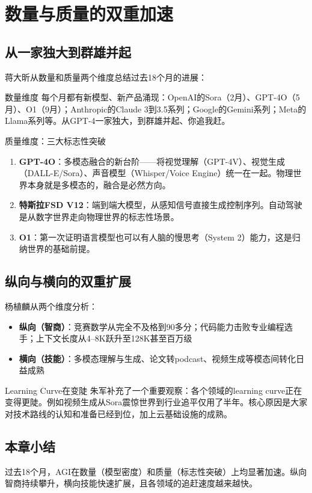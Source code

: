\section{数量与质量的双重加速}

\subsection{从一家独大到群雄并起}

蒋大昕从数量和质量两个维度总结过去18个月的进展：

\begin{knowledgebox}{数量维度}
每个月都有新模型、新产品涌现：OpenAI的Sora（2月）、GPT-4O（5月）、O1（9月）；Anthropic的Claude 3到3.5系列；Google的Gemini系列；Meta的Llama系列等。从GPT-4一家独大，到群雄并起、你追我赶。
\end{knowledgebox}

\begin{importantbox}{质量维度：三大标志性突破}
\begin{enumerate}
\item \textbf{GPT-4O}：多模态融合的新台阶——将视觉理解（GPT-4V）、视觉生成（DALL-E/Sora）、声音模型（Whisper/Voice Engine）统一在一起。物理世界本身就是多模态的，融合是必然方向。
\item \textbf{特斯拉FSD V12}：端到端大模型，从感知信号直接生成控制序列。自动驾驶是从数字世界走向物理世界的标志性场景。
\item \textbf{O1}：第一次证明语言模型也可以有人脑的慢思考（System 2）能力，这是归纳世界的基础前提。
\end{enumerate}
\end{importantbox}

\subsection{纵向与横向的双重扩展}

杨植麟从两个维度分析：

\begin{itemize}
\item \textbf{纵向（智商）}：竞赛数学从完全不及格到90多分；代码能力击败专业编程选手；上下文长度从4--8K跃升至128K甚至百万级
\item \textbf{横向（技能）}：多模态理解与生成、论文转podcast、视频生成等模态间转化日益成熟
\end{itemize}

\begin{knowledgebox}{Learning Curve在变陡}
朱军补充了一个重要观察：各个领域的learning curve正在变得更陡。例如视频生成从Sora震惊世界到行业追平仅用了半年。核心原因是大家对技术路线的认知和准备已经到位，加上云基础设施的成熟。
\end{knowledgebox}

\subsection{本章小结}

过去18个月，AGI在数量（模型密度）和质量（标志性突破）上均显著加速。纵向智商持续攀升，横向技能快速扩展，且各领域的追赶速度越来越快。


